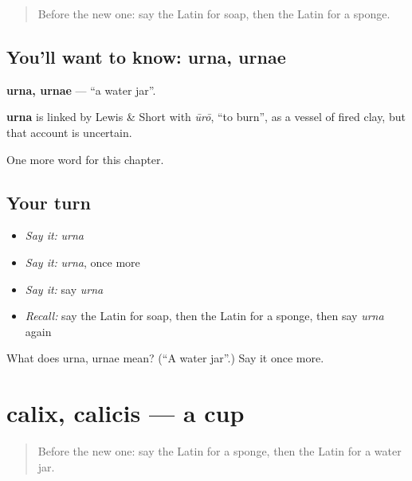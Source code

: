 \label{lesson:LA-C141-urna}



\begin{quote}
Before the new one: say the Latin for soap, then the Latin for a sponge.
\end{quote}

\subsection*{You'll want to know: urna, urnae}
\textbf{urna, urnae} — \textquotedblleft{}a water jar\textquotedblright{}.

\begin{cousinweb}
\textbf{urna} is linked by Lewis \& Short with \emph{ūrō}, \textquotedblleft{}to burn\textquotedblright{}, as a vessel of fired clay, but that account is uncertain.
\end{cousinweb}

\begin{grammarlens}[title={What you've built}]
One more word for this chapter.
\end{grammarlens}

\subsection*{Your turn}
\begin{itemize}
\raggedright
  \item \emph{Say it:} \emph{urna}
  \item \emph{Say it:} \emph{urna}, once more
  \item \emph{Say it:} say \emph{urna}
  \item \emph{Recall:} say the Latin for soap, then the Latin for a sponge, then say \emph{urna} again
\end{itemize}

\begin{tcolorbox}[breakable,colback=teal!4,colframe=teal!35!black,title={Before you move on}]
What does urna, urnae mean? (\textquotedblleft{}A water jar\textquotedblright{}.) Say it once more.
\end{tcolorbox}
\section[calix, calicis]{calix, calicis — a cup}

\label{lesson:LA-C141-calix}



\begin{quote}
Before the new one: say the Latin for a sponge, then the Latin for a water jar.
\end{quote}


